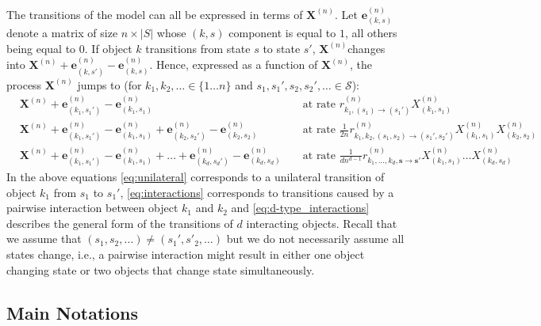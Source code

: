 \documentclass[acmsmall]{acmart}
\newcommand\bs{\mathbf{s}}
\newcommand\be{\mathbf{e}}
\newcommand\bX{\mathbf{X}}
\newcommand\calS{\mathcal{S}}
\newcommand\toN{^{(n)}}
\newcommand\bXn{\bX\toN}
\begin{document}
The transitions of the model can all be expressed in terms of $\bX\toN$. Let $\be\toN_{(k,s)}$ denote a matrix of size $n\times |S|$ whose $(k,s)$ component is equal to $1$, all others being equal to $0$. If object $k$ transitions from state $s$ to state $s'$, $\bXn$changes into $\bXn+\be\toN_{(k,s')}-\be\toN_{(k,s)}$. Hence, expressed as a function of $\bXn$, the process $\bX^{(n)}$ jumps to (for $k_1,k_2, \hdots \in\{1\hdots n\}$ and $s_1,s_1',s_2,s_2',\hdots \in\calS$):
\color{myorange}
\begin{subequations}
  \begin{align}
    &\bX^{(n)} {+} \be\toN_{(k_1,s_1')}{-}\be\toN_{(k_1,s_1)} && \text{ at rate $r_{k_1,(s_1)\rightarrow (s_1')}\toN X_{(k_1,s_1)}^{(n)}$}\label{eq:unilateral}\\
    &\bX^{(n)} {+} \be\toN_{(k_1,s_1')}{-}\be\toN_{(k_1,s_1)} + \be\toN_{(k_2,s_2')}{-}\be\toN_{(k_2,s_2)} && \text{ at rate $\frac{1}{2n}r_{k_1,k_2,(s_1,s_2) \rightarrow (s_1',s_2')}\toN X_{(k_1,s_1)}^{(n)}X_{(k_2,s_2)}^{(n)}$}\label{eq:interactions} \\
    &\bX^{(n)} {+} \be\toN_{(k_1,s_1')}{-}\be\toN_{(k_1,s_1)}{+}\hdots{+}\be\toN_{(k_{d},s_{d}')}{-}\be\toN_{(k_{d},s_{d})} &&\text{ at rate $\frac{1}{d n^{d-1}}r_{k_1,\hdots,k_{d},\bs \rightarrow \bs'}\toN X_{(k_1,s_1)}^{(n)}\hdots X_{(k_{d},s_{d})}^{(n)}$} \label{eq:d-type_interactions}
\end{align}
\label{eq:transitions}
\end{subequations}
In the above equations \eqref{eq:unilateral} corresponds to a unilateral transition of object $k_1$ from $s_1$ to $s_1'$, \eqref{eq:interactions} corresponds to transitions caused by a pairwise interaction between object $k_1$ and $k_2$ and \eqref{eq:d-type_interactions} describes the general form of the transitions of $d$ interacting objects. Recall that we assume that $(s_1,s_2,\hdots)\ne(s_1',s'_2,\hdots)$ but we do not necessarily assume all states change, i.e., a pairwise interaction might result in either one object changing state or two objects that change state simultaneously.
\color{black}



\subsection{Main Notations}
\end{document}

